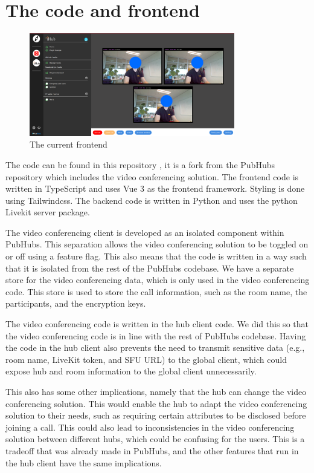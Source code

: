 \documentclass{report}
\begin{document}
\section{The code and frontend}
\begin{figure}[!hbt]
\centering
\includegraphics[width=0.8\textwidth]{img/frontend.png}
\caption{The current frontend}
\label{fig:front-end-setup}
\end{figure}
The code can be found in this repository \cite{horst_gulianrdgdmaster-scriptie-pubhubs_2024}, it is a fork from the PubHubs
repository which includes the video conferencing solution. The frontend code is written in TypeScript and uses Vue 3
as the frontend framework. Styling is done using Tailwindcss. The backend code is written in Python and uses the
python Livekit server package.

The video conferencing client is developed as an isolated component within PubHubs. This separation allows the
video conferencing solution to be toggled on or off using a feature flag.
This also means that the code is written in a way such that it is isolated from the rest of the PubHubs codebase.
We have a separate store for the video conferencing data, which is only used in the video conferencing code.
This store is used to store the call information, such as the room name, the participants, and the encryption keys.

The video conferencing code is written in the hub client code. We did this so that the video conferencing code is in
line with the rest of PubHubs codebase.
Having the code in the hub client also prevents the need to transmit sensitive data (e.g., room name, LiveKit token,
and SFU URL) to the global client, which could expose hub and room information to the global client unnecessarily.

This also has some other implications, namely that the hub can change the video conferencing solution.
This would enable the hub to adapt the video conferencing solution to their needs, such as requiring certain
attributes to be disclosed before joining a call.
This could also lead to inconsistencies in the video conferencing solution between different hubs, which could be
confusing for the users. This is a tradeoff that was already made in PubHubs, and the other features that run in the
hub client have the same implications.
\end{document}
